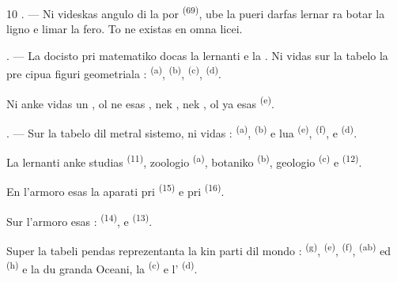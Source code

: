 \begin{VUpage}[12]{10}
. --- Ni videskas angulo di la  por\nl
{} \textsuperscript{(69)}, ube la pueri darfas lernar ra\cc
botar la ligno e limar la fero. To ne existas en\nl
omna licei.

\VUsaut{5.0mm}
\VUsaut{3.6mm}

. --- La docisto pri matematiko docas \nl
la lernanti  e la\nl
{}. Ni vidas sur la tabelo la pre\cc
cipua figuri geometriala :  \textsuperscript{(a)}, \cc
{} \textsuperscript{(b)},  \textsuperscript{(c)},  \textsuperscript{(d)}.

\VUblancAlinea
Ni anke vidas un , ol ne esas \cc
{}, nek , nek , ol ya\nl
esas  \textsuperscript{(e)}.

. --- Sur la tabelo dil metral sistemo, ni\nl
vidas :  \textsuperscript{(a)},  \textsuperscript{(b)} e lua \nl
{} \textsuperscript{(e)},  \textsuperscript{(f)},  e  \textsuperscript{(d)}.

\VUblancAlinea
La lernanti anke studias  \textsuperscript{(11)},\nl
zoologio \textsuperscript{(a)}, botaniko \textsuperscript{(b)}, geologio \textsuperscript{(c)} e \cc
{} \textsuperscript{(12)}.

\VUblancAlinea
En l'armoro esas la aparati pri  \textsuperscript{(15)} e\nl
pri  \textsuperscript{(16)}.

\VUblancAlinea
Sur l'armoro esas :  \textsuperscript{(14)},  e \cc
{} \textsuperscript{(13)}.

\VUblancAlinea
Super la tabeli pendas  reprezentanta\nl
la kin parti dil mondo :  \textsuperscript{(g)},  \textsuperscript{(e)},\nl
{} \textsuperscript{(f)},  \textsuperscript{(ab)} ed  \textsuperscript{(h)} e la du\nl
granda Oceani, la  \textsuperscript{(c)} e l' \textsuperscript{(d)}.

\VUsaut{6.0mm}
\VUfilet{22mm}
\end{VUpage}
